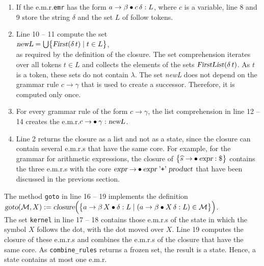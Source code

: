 \begin{enumerate}
\item If the e.m.r.\@ \texttt{emr} has the form $a \rightarrow \beta \mdot c\, \delta: L$, where $c$ is a
      variable, line 8 and 9 store the string $\delta$ and the set $L$ of follow tokens.
\item Line 10 -- 11 compute the set
      \\[0.2cm]
      \hspace*{1.3cm}
      $\textsl{newL} = \bigcup \bigl\{ \textsl{First}(\delta\, t) \mid t \in L \bigr\}$,
      \\[0.2cm]
      as required by the definition of the closure.  The set comprehension iterates over all tokens $t \in L$ and
      collects the elements of the sets $\textsl{FirstList}(\delta\, t)$.  As $t$ is a token, these sets do not
      contain $\lambda$.  The set \textsl{newL} does not depend on the grammar rule $c \rightarrow \gamma$ that is
      used to create a successor.  Therefore, it is computed only once.
\item For every grammar rule of the form $c \rightarrow \gamma$, the list comprehension in line 12 -- 14 creates
      the e.m.r.\@ $c \rightarrow \mdot \gamma: \textsl{newL}$.
\item Line 2 returns the closure as a list and not as a state, since the closure can contain several e.m.r.s
      that have the same core.  For example, for the grammar for arithmetic expressions, the closure of
      $\bigl\{\widehat{s} \rightarrow \mdot \textsl{expr}: \symbol{36}\bigr\}$ contains the three e.m.r.s with
      the core $\textsl{expr} \rightarrow \mdot \textsl{expr} \aquoted{+} \textsl{product}$ that have been
      discussed in the previous section.
\end{enumerate}
The method \texttt{goto} in line 16 -- 19 implements the definition
\\[0.2cm]
\hspace*{1.3cm}
$\textsl{goto}(\mathcal{M}, X) := \textsl{closure}\Bigl( \bigl\{
   a \rightarrow \beta\, X \mdot \delta:L \mid (a \rightarrow \beta \mdot X\, \delta:L) \in \mathcal{M}
   \bigr\} \Bigr)$.
\\[0.2cm]
The set \texttt{kernel} in line 17 -- 18 contains those e.m.r.s of the state in which the symbol $X$ follows the
dot, with the dot moved over $X$.  Line 19 computes the closure of these e.m.r.s and combines the e.m.r.s of the
closure that have the same core.  As \texttt{combine\_rules} returns a frozen set, the result is a state.  Hence, a state contains at most one e.m.r.\@
